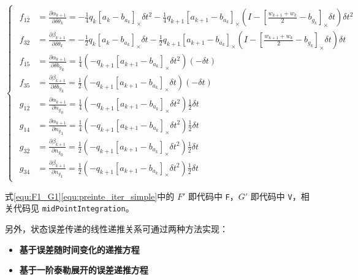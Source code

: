 \documentclass[12pt,a4paper]{article}
\begin{document}
\begin{equation}
\begin{cases}
\begin{aligned}
f_{12} &= \frac{\partial{\alpha_{k+1}}}{\partial{\delta \theta_k}} = 
-\frac{1}{4}q_{k}[a_{k}-b_{a_{k}}]_{\times}\delta t^{2}-\frac{1}{4}q_{k+1}[a_{k+1}-b_{a_{k}}]_{\times}(I-[\frac{w_{k+1}+w_{k}}{2}-b_{g_{k}}]_{\times }\delta t)\delta t^{2} \\
f_{32} &= \frac{\partial{\beta_{k+1}}}{\partial{\delta \theta_k}} =
-\frac{1}{2}q_{k}[a_{k}-b_{a_{k}}]_{\times}\delta t-\frac{1}{2}q_{k+1}[a_{k+1}-b_{a_{k}}]_{\times}(I-[\frac{w_{k+1}+w_{k}}{2}-b_{g_{k}}]_{\times }\delta t)\delta t \\
f_{15} &= \frac{\partial{\alpha_{k+1}}}{\partial{\delta {b_g}_k}} =
\frac{1}{4}(-q_{k+1}[a_{k+1}-b_{a_{k}}]_{\times}\delta t^{2})(-\delta t) \\
f_{35} &= \frac{\partial{\beta_{k+1}}}{\partial{\delta {b_g}_k}} =
\frac{1}{2}(-q_{k+1}[a_{k+1}-b_{a_{k}}]_{\times}\delta t)(-\delta t) \\
g_{12} &= \frac{\partial{\alpha_{k+1}}}{\partial{{n_g}_0}} = 
\frac{1}{4}(-q_{k+1}[a_{k+1}-b_{a_{k}}]_{\times}\delta t^{2})\frac{1}{2}\delta t \\
g_{14} &= \frac{\partial{\alpha_{k+1}}}{\partial{{n_g}_1}} = 
\frac{1}{4}(-q_{k+1}[a_{k+1}-b_{a_{k}}]_{\times}\delta t^{2})\frac{1}{2}\delta t \\
g_{32} &= \frac{\partial{\beta_{k+1}}}{\partial{{n_g}_0}} =
\frac{1}{2}(-q_{k+1}[a_{k+1}-b_{a_{k}}]_{\times}\delta t^{2})\frac{1}{2}\delta t \\
g_{34} &= \frac{\partial{\beta_{k+1}}}{\partial{{n_g}_1}} =
\frac{1}{2}(-q_{k+1}[a_{k+1}-b_{a_{k}}]_{\times}\delta t^{2})\frac{1}{2}\delta t
\end{aligned}
\end{cases}
\end{equation}

式\eqref{equ:F1_G1}\eqref{equ:preinte_iter_simple}中的 $F'$ 即代码中 \verb|F|，$G'$ 即代码中 \verb|V|，相关代码见 \verb|midPointIntegration|。

另外，状态误差传递的线性递推关系可通过两种方法实现：

\begin{itemize}[itemindent=1em]
  \item \textbf{基于误差随时间变化的递推方程}
  \item \textbf{基于一阶泰勒展开的误差递推方程}
\end{itemize}
\end{document}
